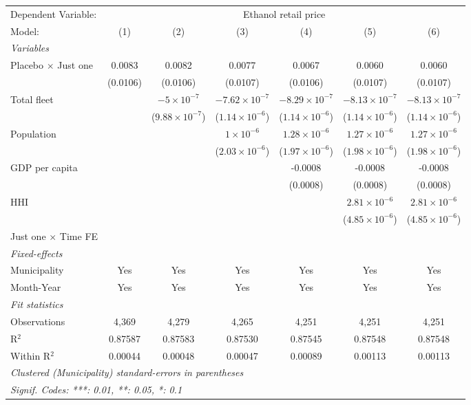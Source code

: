 \documentclass[
]{article}
\begin{document}
\begin{tabular}{lcccccc}
\tabularnewline\midrule\midrule
Dependent Variable:&\multicolumn{6}{c}{Ethanol retail price}\\
Model:&(1) & (2) & (3) & (4) & (5) & (6)\\
\midrule \emph{Variables}&   &   &   &   &   &  \\
Placebo $\times $ Just one & 0.0083 & 0.0082 & 0.0077 & 0.0067 & 0.0060 & 0.0060\\
  &(0.0106) & (0.0106) & (0.0107) & (0.0106) & (0.0107) & (0.0107)\\
Total fleet &    & $-5\times 10^{-7}$ & $-7.62\times 10^{-7}$ & $-8.29\times 10^{-7}$ & $-8.13\times 10^{-7}$ & $-8.13\times 10^{-7}$\\
  &   & ($9.88\times 10^{-7}$) & ($1.14\times 10^{-6}$) & ($1.14\times 10^{-6}$) & ($1.14\times 10^{-6}$) & ($1.14\times 10^{-6}$)\\
Population &    &    & $1\times 10^{-6}$ & $1.28\times 10^{-6}$ & $1.27\times 10^{-6}$ & $1.27\times 10^{-6}$\\
  &   &    & ($2.03\times 10^{-6}$) & ($1.97\times 10^{-6}$) & ($1.98\times 10^{-6}$) & ($1.98\times 10^{-6}$)\\
GDP per capita &    &    &    & -0.0008 & -0.0008 & -0.0008\\
  &   &    &    & (0.0008) & (0.0008) & (0.0008)\\
HHI &    &    &    &    & $2.81\times 10^{-6}$ & $2.81\times 10^{-6}$\\
  &   &    &    &    & ($4.85\times 10^{-6}$) & ($4.85\times 10^{-6}$)\\
Just one $\times$ Time FE &  &  &  &  &  & \\
\midrule \emph{Fixed-effects}&   &   &   &   &   &  \\
Municipality & Yes & Yes & Yes & Yes & Yes & Yes\\
Month-Year & Yes & Yes & Yes & Yes & Yes & Yes\\
\midrule \emph{Fit statistics}&  & & & & & \\
Observations & 4,369&4,279&4,265&4,251&4,251&4,251\\
R$^2$ & 0.87587&0.87583&0.87530&0.87545&0.87548&0.87548\\
Within R$^2$ & 0.00044&0.00048&0.00047&0.00089&0.00113&0.00113\\
\midrule\midrule\multicolumn{7}{l}{\emph{Clustered (Municipality) standard-errors in parentheses}}\\
\multicolumn{7}{l}{\emph{Signif. Codes: ***: 0.01, **: 0.05, *: 0.1}}\\
\end{tabular}
\end{document}
